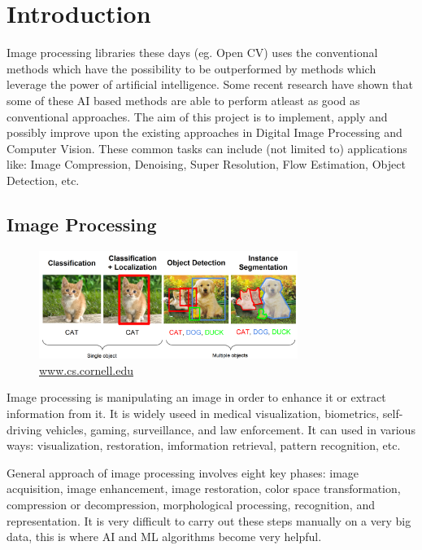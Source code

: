 \chapter{Introduction}
\hspace{3mm}

Image processing libraries these days (eg. Open CV) uses the conventional methods which have the possibility to be outperformed by methods which leverage the power of artificial intelligence. Some recent research have shown that some of these AI based methods are able to perform atleast as good as conventional approaches. The aim of this project is to implement, apply and possibly improve upon the existing approaches in Digital Image Processing and Computer Vision. These common tasks can include (not limited to) applications like: Image Compression, Denoising, Super Resolution, Flow Estimation, Object Detection, etc.


\section{Image Processing}

\begin{figure}[!ht]
    \centering
    \includegraphics[width=0.75\textwidth]{fig/1-1.png}
    {\href{https://www.cs.cornell.edu/courses/cs4670/2016sp/lectures/lec41_recowrapup_web.pdf}{www.cs.cornell.edu}}
    \label{fig:exPatternRecognition}
\end{figure}

Image processing is manipulating an image in order to enhance it or extract information from it. It is widely useed in medical visualization, biometrics, self-driving vehicles, gaming, surveillance, and law enforcement. It can used in various ways: visualization, restoration, imformation retrieval, pattern recognition, etc.

General approach of image processing involves eight key phases: image acquisition, image enhancement, image restoration, color space transformation, compression or decompression, morphological processing, recognition, and representation. It is very difficult to carry out these steps manually on a very big data, this is where AI and ML algorithms become very helpful.

